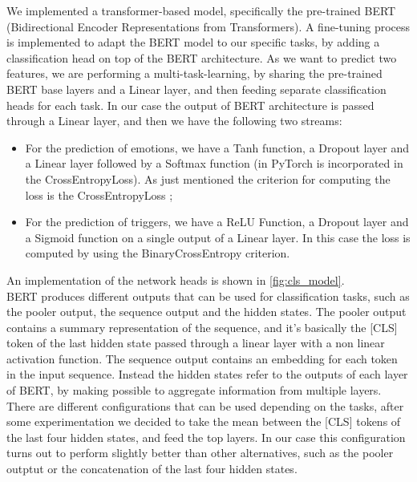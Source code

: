 \documentclass[11pt,table,xcdraw]{article}
\begin{document}
We implemented a transformer-based model, specifically the pre-trained BERT (Bidirectional Encoder Representations from Transformers). A fine-tuning process is implemented to adapt the BERT model to our specific tasks, by adding a classification head on top of the BERT architecture. As we want to predict two features, we are performing a multi-task-learning, by sharing the pre-trained BERT base layers and a Linear layer, and then feeding separate classification heads for each task. In our case the output of BERT architecture is passed through a Linear layer,  and then we have the following two streams:
\begin{itemize}
    \item For the prediction of emotions, we have a Tanh function, a Dropout layer and a Linear layer followed by a Softmax function (in PyTorch is incorporated in the CrossEntropyLoss). As just mentioned the criterion for computing the loss is the CrossEntropyLoss ;
    \item For the prediction of triggers, we have a ReLU Function, a Dropout layer and a Sigmoid function on a single output of a Linear layer. In this case the loss is computed by using the BinaryCrossEntropy criterion.
\end{itemize}
An implementation of the network heads is shown in \autoref{fig:cls_model}.\\
 
BERT produces different outputs that can be used for classification tasks, such as the pooler output, the sequence output and the hidden states. The pooler output contains a summary representation of the sequence, and it's basically the [CLS] token of the last hidden state passed through a linear layer with a non linear activation function. The sequence output contains an embedding for each token in the input sequence. Instead the hidden states refer to the outputs of each layer of BERT, by making possible to aggregate information from multiple layers. There are different configurations that can be used depending on the tasks, after some experimentation we decided to take the mean between the [CLS] tokens of the last four hidden states, and feed the top layers. In our case this configuration turns out to perform slightly better than other alternatives, such as the pooler outptut or the concatenation of the last four hidden states.\\

\end{document}
